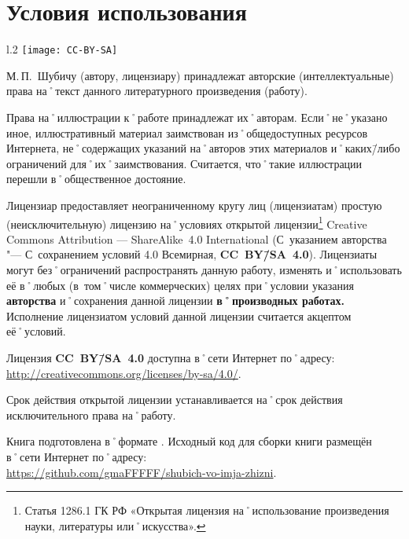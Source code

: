 ﻿%
\chapter{Условия использования}

\begin{wrapfigure}{l}{.2\textwidth}
\centering
\texttt{[image: CC-BY-SA]}
\label{fig:CC-BY-SA}
\end{wrapfigure}

\noindent М.\,П.~Шубичу (автору, лицензиару) принадлежат авторские (интеллектуальные) права на˚текст данного литературного произведения (работу). 

\noindent Права на˚иллюстрации к˚работе принадлежат их˚авторам. Если˚не˚указано иное, иллюстративный материал заимствован из˚общедоступных ресурсов Интернета, не˚содержащих указаний на˚авторов этих материалов и˚каких\=/либо ограничений для˚их˚заимствования. Считается, что˚такие иллюстрации перешли в˚общественное достояние.

Лицензиар предоставляет неограниченному кругу лиц (лицензиатам) простую (неисключительную) лицензию на˚условиях открытой лицензии\footnote
{Статья 1286.1 ГК РФ «Открытая лицензия на˚использование произведения науки, литературы или˚искусства».}
\foreignlanguage{english}{Creative Commons Attribution --- ShareAlike~4.0 International} (С~указанием авторства "--- С~сохранением условий 4.0 Всемирная, \textbf{CC~BY\=/SA~4.0}). Лицензиаты могут без˚ограничений распространять данную работу, изменять и˚использовать её в˚любых (в~том˚числе коммерческих) целях при˚условии указания \textbf{авторства} и˚сохранения данной лицензии \textbf{в˚производных работах.}
Исполнение лицензиатом условий данной лицензии считается акцептом её˚условий.

Лицензия \textbf{CC~BY\=/SA~4.0} доступна в˚сети Интернет по˚адресу: \url{http://creativecommons.org/licenses/by-sa/4.0/}. 

Срок действия открытой лицензии устанавливается на˚срок действия исключительного права на˚работу.

Книга подготовлена в˚формате \LaTeXe{}. Исходный код для сборки книги размещён в˚сети Интернет по˚адресу:\\ {\small\url{ https://github.com/gmaFFFFF/shubich-vo-imja-zhizni}}.{\sloppy

}%

